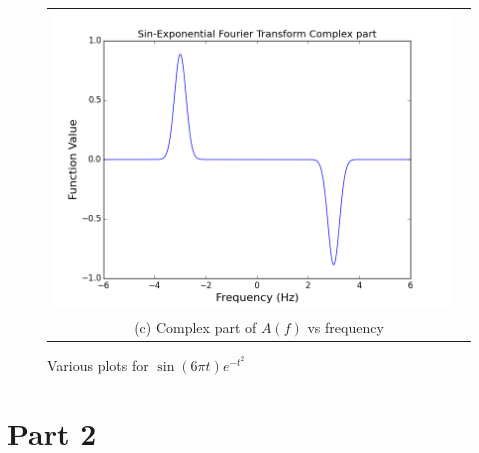 \documentclass[11pt]{article}
\begin{document}
\begin{figure}[ht]
\begin{tabular}{cc}
\includegraphics[scale=.4]{sin_fourComp.png}\\
\multicolumn{2}{c}{(c) Complex part of $A(f)$ vs frequency} \\[6pt]
\end{tabular}
\caption{Various plots for $\sin (6\pi t) e^{-t^2} $}
\end{figure}


\section{Part 2}
\end{document}
